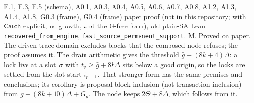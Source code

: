 \documentclass{article}
\begin{document}
{F.1, F.3, F.5 (schema), A0.1, A0.3, A0.4, A0.5, A0.6, A0.7, A0.8, A1.2,
A1.3, A1.4, A1.8, G0.3 (frame), G0.4 (frame)}
{paper proof (not in this repository; with $\mathsf{Catch}$ explicit, no
growth, and the G-free form); old plain-SA Lean \texttt{recovered\_from\_engine},
\texttt{fast\_source\_permanent\_support}.}
{M.  Proved on paper.  The driven-trace domain excludes
blocks that the composed node refuses; the proof assumes it.  The
drain arithmetic gives the threshold
$\bar g+(8k+4)\Delta$: a lock live at a slot~$\sigma$ with
$t_\sigma\geq\bar g+8k\Delta$ sits below a good origin, so the locks are
settled from the slot start $t_{p-1}$.  That stronger form has the same
premises and conclusions; its corollary is proposal-block
inclusion (not transaction inclusion) from $\bar g+(8k+10)\Delta+G_p$.
The node keeps $2\Theta+8\Delta$, which follows from it.}
\end{document}
